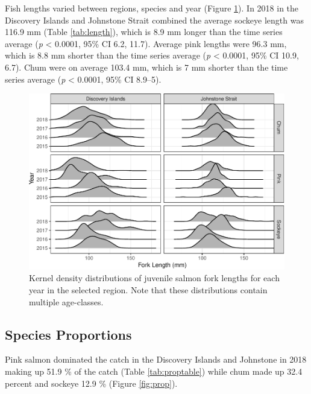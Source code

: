 \documentclass[fleqn,10pt]{wlpeerj} %
\begin{document}
Fish lengths varied between regions, species and year (Figure
\ref{fig:lengthplot}). In 2018 in the Discovery Islands and Johnstone
Strait combined the average sockeye length was 116.9 mm (Table
\ref{tab:length}), which is 8.9 mm longer than the time series average
(\emph{p} \textless{} 0.0001, 95\% CI 6.2, 11.7). Average pink lengths
were 96.3 mm, which is 8.8 mm shorter than the time series average
(\emph{p} \textless{} 0.0001, 95\% CI 10.9, 6.7). Chum were on average
103.4 mm, which is 7 mm shorter than the time series average (\emph{p}
\textless{} 0.0001, 95\% CI 8.9--5).

\begin{figure}[H]
\includegraphics[width=0.8\linewidth]{peer_j_migration_dynamics_files/figure-latex/lengthplot-1} \caption{Kernel density distributions of juvenile salmon fork lengths for each year in the selected region. Note that these distributions contain multiple age-classes.}\label{fig:lengthplot}
\end{figure}

\subsection*{Species Proportions}\label{species-proportions}

Pink salmon dominated the catch in the Discovery Islands and Johnstone
in 2018 making up 51.9 \% of the catch (Table \ref{tab:proptable}) while
chum made up 32.4 percent and sockeye 12.9 \% (Figure \ref{fig:prop}).
\end{document}
